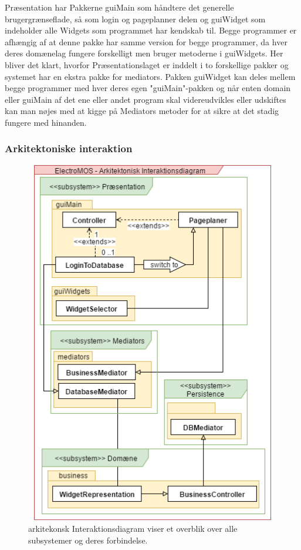 Præsentation har Pakkerne guiMain som håndtere det generelle brugergrænseflade, så som login og pageplanner delen og guiWidget  som indeholder alle Widgets som programmet har kendskab til. Begge programmer er afhængig af at denne pakke har samme version for begge programmer, da hver deres domænelag fungere forskelligt men bruger metoderne i guiWidgets. Her bliver det klart, hvorfor Præsentationslaget er inddelt i to forskellige pakker og systemet har en ekstra pakke for mediators. Pakken guiWidget kan deles mellem begge programmer med hver deres egen "guiMain"-pakken og når enten domain eller guiMain af det ene eller andet program skal videreudvikles eller udskiftes kan man nøjes med at kigge på Mediators metoder for at sikre at det stadig fungere med hinanden.

\subsubsection{Arkitektoniske interaktion}
\begin{center}
  \begin{figure}[H]
 	 \includegraphics[height=16cm, width=12cm]{elaborationsdokumentet/figurer/design/soft-ark/Design-CMS-Arkitektonisk-Interaktionsdiagram-Simpel.png}
     \caption{arkitekonsk Interaktionsdiagram viser et overblik over alle subsystemer og deres forbindelse.}
     \label{AI-Overblik.}
  \end{figure}
\end{center}


